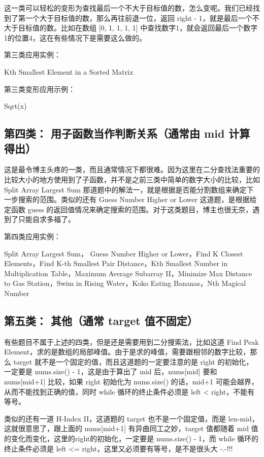 \documentclass[9pt, b5paaper]{book}
\begin{document}
这一类可以轻松的变形为查找最后一个不大于目标值的数，怎么变呢。我们已经找到了第一个大于目标值的数，那么再往前退一位，返回 right - 1，就是最后一个不大于目标值的数。比如在数组 [0, 1, 1, 1, 1] 中查找数字1，就会返回最后一个数字1的位置4，这在有些情况下是需要这么做的。

第三类应用实例：

Kth Smallest Element in a Sorted Matrix

第三类变形应用示例：

Sqrt(x)

\subsection{第四类： 用子函数当作判断关系（通常由 mid 计算得出）}
\label{sec-5-1-9}

这是最令博主头疼的一类，而且通常情况下都很难。因为这里在二分查找法重要的比较大小的地方使用到了子函数，并不是之前三类中简单的数字大小的比较，比如 Split Array Largest Sum 那道题中的解法一，就是根据是否能分割数组来确定下一步搜索的范围。类似的还有 Guess Number Higher or Lower 这道题，是根据给定函数 guess 的返回值情况来确定搜索的范围。对于这类题目，博主也很无奈，遇到了只能自求多福了。

第四类应用实例：

Split Array Largest Sum， Guess Number Higher or Lower，Find K Closest Elements，Find K-th Smallest Pair Distance，Kth Smallest Number in Multiplication Table，Maximum Average Subarray II，Minimize Max Distance to Gas Station，Swim in Rising Water，Koko Eating Bananas，Nth Magical Number

\subsection{第五类： 其他（通常 target 值不固定）}
\label{sec-5-1-10}

有些题目不属于上述的四类，但是还是需要用到二分搜索法，比如这道 Find Peak Element，求的是数组的局部峰值。由于是求的峰值，需要跟相邻的数字比较，那么 target 就不是一个固定的值，而且这道题的一定要注意的是 right 的初始化，一定要是 nums.size() - 1，这是由于算出了 mid 后，nums[mid] 要和 nums[mid+1] 比较，如果 right 初始化为 nums.size() 的话，mid+1 可能会越界，从而不能找到正确的值，同时 while 循环的终止条件必须是 left < right，不能有等号。

类似的还有一道 H-Index II，这道题的 target 也不是一个固定值，而是 len-mid，这就很意思了，跟上面的 nums[mid+1] 有异曲同工之妙，target 值都随着 mid 值的变化而变化，这里的right的初始化，一定要是 nums.size() - 1，而 while 循环的终止条件必须是 left <= right，这里又必须要有等号，是不是很头大 -.-!!!
\end{document}
